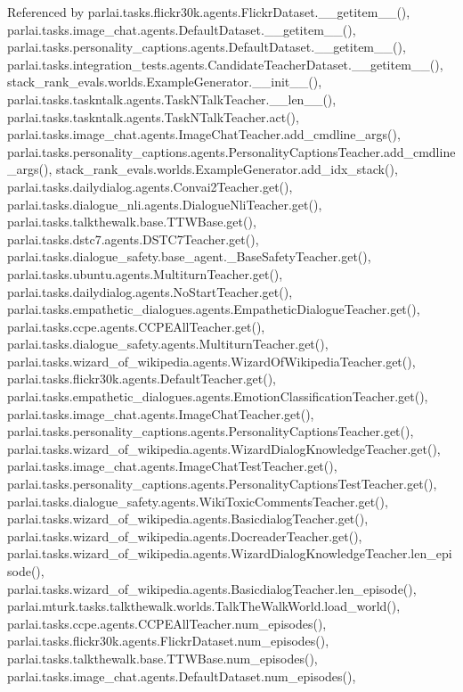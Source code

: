 Referenced by parlai.\+tasks.\+flickr30k.\+agents.\+Flickr\+Dataset.\+\_\+\+\_\+getitem\+\_\+\+\_\+(), parlai.\+tasks.\+image\+\_\+chat.\+agents.\+Default\+Dataset.\+\_\+\+\_\+getitem\+\_\+\+\_\+(), parlai.\+tasks.\+personality\+\_\+captions.\+agents.\+Default\+Dataset.\+\_\+\+\_\+getitem\+\_\+\+\_\+(), parlai.\+tasks.\+integration\+\_\+tests.\+agents.\+Candidate\+Teacher\+Dataset.\+\_\+\+\_\+getitem\+\_\+\+\_\+(), stack\+\_\+rank\+\_\+evals.\+worlds.\+Example\+Generator.\+\_\+\+\_\+init\+\_\+\+\_\+(), parlai.\+tasks.\+taskntalk.\+agents.\+Task\+N\+Talk\+Teacher.\+\_\+\+\_\+len\+\_\+\+\_\+(), parlai.\+tasks.\+taskntalk.\+agents.\+Task\+N\+Talk\+Teacher.\+act(), parlai.\+tasks.\+image\+\_\+chat.\+agents.\+Image\+Chat\+Teacher.\+add\+\_\+cmdline\+\_\+args(), parlai.\+tasks.\+personality\+\_\+captions.\+agents.\+Personality\+Captions\+Teacher.\+add\+\_\+cmdline\+\_\+args(), stack\+\_\+rank\+\_\+evals.\+worlds.\+Example\+Generator.\+add\+\_\+idx\+\_\+stack(), parlai.\+tasks.\+dailydialog.\+agents.\+Convai2\+Teacher.\+get(), parlai.\+tasks.\+dialogue\+\_\+nli.\+agents.\+Dialogue\+Nli\+Teacher.\+get(), parlai.\+tasks.\+talkthewalk.\+base.\+T\+T\+W\+Base.\+get(), parlai.\+tasks.\+dstc7.\+agents.\+D\+S\+T\+C7\+Teacher.\+get(), parlai.\+tasks.\+dialogue\+\_\+safety.\+base\+\_\+agent.\+\_\+\+Base\+Safety\+Teacher.\+get(), parlai.\+tasks.\+ubuntu.\+agents.\+Multiturn\+Teacher.\+get(), parlai.\+tasks.\+dailydialog.\+agents.\+No\+Start\+Teacher.\+get(), parlai.\+tasks.\+empathetic\+\_\+dialogues.\+agents.\+Empathetic\+Dialogue\+Teacher.\+get(), parlai.\+tasks.\+ccpe.\+agents.\+C\+C\+P\+E\+All\+Teacher.\+get(), parlai.\+tasks.\+dialogue\+\_\+safety.\+agents.\+Multiturn\+Teacher.\+get(), parlai.\+tasks.\+wizard\+\_\+of\+\_\+wikipedia.\+agents.\+Wizard\+Of\+Wikipedia\+Teacher.\+get(), parlai.\+tasks.\+flickr30k.\+agents.\+Default\+Teacher.\+get(), parlai.\+tasks.\+empathetic\+\_\+dialogues.\+agents.\+Emotion\+Classification\+Teacher.\+get(), parlai.\+tasks.\+image\+\_\+chat.\+agents.\+Image\+Chat\+Teacher.\+get(), parlai.\+tasks.\+personality\+\_\+captions.\+agents.\+Personality\+Captions\+Teacher.\+get(), parlai.\+tasks.\+wizard\+\_\+of\+\_\+wikipedia.\+agents.\+Wizard\+Dialog\+Knowledge\+Teacher.\+get(), parlai.\+tasks.\+image\+\_\+chat.\+agents.\+Image\+Chat\+Test\+Teacher.\+get(), parlai.\+tasks.\+personality\+\_\+captions.\+agents.\+Personality\+Captions\+Test\+Teacher.\+get(), parlai.\+tasks.\+dialogue\+\_\+safety.\+agents.\+Wiki\+Toxic\+Comments\+Teacher.\+get(), parlai.\+tasks.\+wizard\+\_\+of\+\_\+wikipedia.\+agents.\+Basicdialog\+Teacher.\+get(), parlai.\+tasks.\+wizard\+\_\+of\+\_\+wikipedia.\+agents.\+Docreader\+Teacher.\+get(), parlai.\+tasks.\+wizard\+\_\+of\+\_\+wikipedia.\+agents.\+Wizard\+Dialog\+Knowledge\+Teacher.\+len\+\_\+episode(), parlai.\+tasks.\+wizard\+\_\+of\+\_\+wikipedia.\+agents.\+Basicdialog\+Teacher.\+len\+\_\+episode(), parlai.\+mturk.\+tasks.\+talkthewalk.\+worlds.\+Talk\+The\+Walk\+World.\+load\+\_\+world(), parlai.\+tasks.\+ccpe.\+agents.\+C\+C\+P\+E\+All\+Teacher.\+num\+\_\+episodes(), parlai.\+tasks.\+flickr30k.\+agents.\+Flickr\+Dataset.\+num\+\_\+episodes(), parlai.\+tasks.\+talkthewalk.\+base.\+T\+T\+W\+Base.\+num\+\_\+episodes(), parlai.\+tasks.\+image\+\_\+chat.\+agents.\+Default\+Dataset.\+num\+\_\+episodes(), 